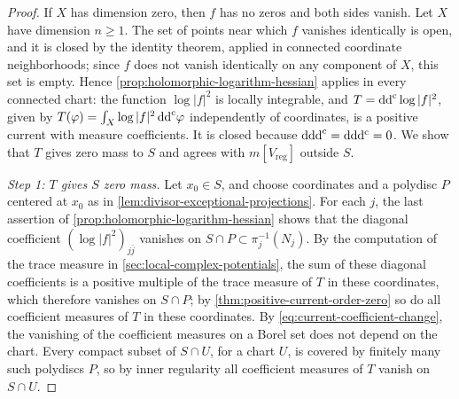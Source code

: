 \begin{proof}
If $X$ has dimension zero, then $f$ has no zeros and both sides vanish. Let $X$ have dimension $n\geq1$. The set of points near which $f$ vanishes identically is open, and it is closed by the identity theorem, applied in connected coordinate neighborhoods; since $f$ does not vanish identically on any component of $X$, this set is empty. Hence \cref{prop:holomorphic-logarithm-hessian} applies in every connected chart: the function $\log|f|^2$ is locally integrable, and $T=\mathrm{dd}^{\mathrm{c}}\log|f|^2$, given by $T(\varphi)=\int_X\log|f|^2\,\mathrm{dd}^{\mathrm{c}}\varphi$ independently of coordinates, is a positive current with measure coefficients. It is closed because $\mathrm d\mathrm{dd}^{\mathrm{c}}=\mathrm d\mathrm d\mathrm d^{\mathrm c}=0$. We show that $T$ gives zero mass to $S$ and agrees with $m[V_{\mathrm{reg}}]$ outside $S$.

\emph{Step 1: $T$ gives $S$ zero mass.} Let $x_0\in S$, and choose coordinates and a polydisc $P$ centered at $x_0$ as in \cref{lem:divisor-exceptional-projections}. For each $j$, the last assertion of \cref{prop:holomorphic-logarithm-hessian} shows that the diagonal coefficient $(\log|f|^2)_{j\bar j}$ vanishes on $S\cap P\subset\pi_j^{-1}(N_j)$. By the computation of the trace measure in \cref{sec:local-complex-potentials}, the sum of these diagonal coefficients is a positive multiple of the trace measure of $T$ in these coordinates, which therefore vanishes on $S\cap P$; by \cref{thm:positive-current-order-zero} so do all coefficient measures of $T$ in these coordinates. By \eqref{eq:current-coefficient-change}, the vanishing of the coefficient measures on a Borel set does not depend on the chart. Every compact subset of $S\cap U$, for a chart $U$, is covered by finitely many such polydiscs $P$, so by inner regularity all coefficient measures of $T$ vanish on $S\cap U$.


\end{proof}
